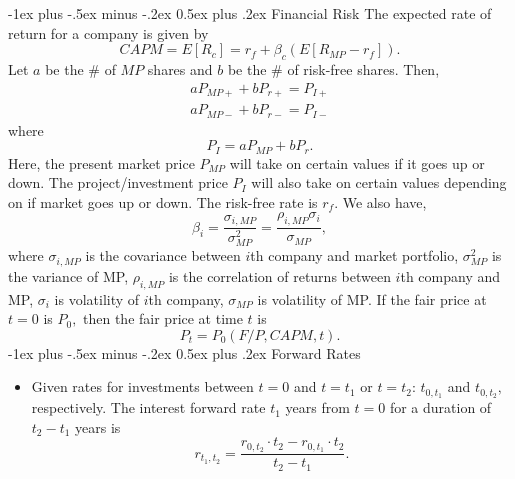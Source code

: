\documentclass[11pt,landscape]{article}
\makeatletter
\renewcommand{\section}{\@startsection{section}{1}{0mm}%
                                {-1ex plus -.5ex minus -.2ex}%
                                {0.5ex plus .2ex}%
                                {\normalfont\large\bfseries}}
\makeatother
\begin{document}
\begin{multicols*}{3}
\section{Financial Risk}
The expected rate of return for a company is given by
$$CAPM = E[R_c] = r_f + \beta_c\left(E[R_{MP} - r_f]\right).$$
Let $a$ be the \# of $MP$ shares and $b$ be the \# of risk-free shares. Then,
\begin{align*}
    aP_{MP+} + bP_{r+} = P_{I+} \\ 
    aP_{MP-} + bP_{r-} = P_{I-}
\end{align*}
where
\begin{equation*}
    P_I = aP_{MP} + bP_r.
\end{equation*}
Here, the present market price $P_{MP}$ will take on certain values if it goes up or down. The project/investment price $P_I$ will also take on certain values depending on if market goes up or down. The risk-free rate is $r_f.$ We also have,
\begin{equation*}
    \beta_i = \frac{\sigma_{i,MP}}{\sigma_{MP}^2} = \frac{\rho_{i,MP}\sigma_i}{\sigma_{MP}},
\end{equation*}
where $\sigma_{i,MP}$ is the covariance between $i$th company and market portfolio, $\sigma_{MP}^2$ is the variance of MP, $\rho_{i,MP}$ is the correlation of returns between $i$th company and MP, $\sigma_i$ is volatility of $i$th company, $\sigma_{MP}$ is volatility of MP. If the fair price at $t=0$ is $P_0,$ then the fair price at time $t$ is 
\begin{equation*}
    P_t = P_0 (F/P, CAPM, t).
\end{equation*}
\section{Forward Rates}
\begin{itemize}
    \item Given rates for investments between $t=0$ and $t=t_1$ or $t=t_2$: $t_{0,t_1}$ and $t_{0,t_2},$ respectively. The interest forward rate $t_1$ years from $t=0$ for a duration of $t_2-t_1$ years is 
    \begin{equation*}
        r_{t_1,t_2} = \frac{r_{0,t_2} \cdot t_2 - r_{0,t_1}\cdot t_2}{t_2-t_1}.
    \end{equation*}
\end{itemize}

\end{multicols*}
\end{document}

